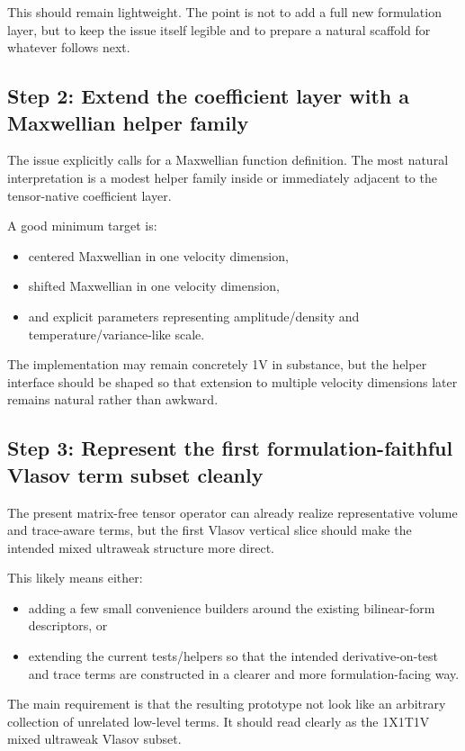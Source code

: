\documentclass[11pt]{article}
\begin{document}
This should remain lightweight. The point is not to add a full new formulation layer, but to keep the issue itself legible and to prepare a natural scaffold for whatever follows next.

\subsection{Step 2: Extend the coefficient layer with a Maxwellian helper family}

The issue explicitly calls for a Maxwellian function definition. The most natural interpretation is a modest helper family inside or immediately adjacent to the tensor-native coefficient layer.

A good minimum target is:
\begin{itemize}[leftmargin=2em]
\item centered Maxwellian in one velocity dimension,
\item shifted Maxwellian in one velocity dimension,
\item and explicit parameters representing amplitude/density and temperature/variance-like scale.
\end{itemize}

The implementation may remain concretely 1V in substance, but the helper interface should be shaped so that extension to multiple velocity dimensions later remains natural rather than awkward.

\subsection{Step 3: Represent the first formulation-faithful Vlasov term subset cleanly}

The present matrix-free tensor operator can already realize representative volume and trace-aware terms, but the first Vlasov vertical slice should make the intended mixed ultraweak structure more direct.

This likely means either:
\begin{itemize}[leftmargin=2em]
\item adding a few small convenience builders around the existing bilinear-form descriptors, or
\item extending the current tests/helpers so that the intended derivative-on-test and trace terms are constructed in a clearer and more formulation-facing way.
\end{itemize}

The main requirement is that the resulting prototype not look like an arbitrary collection of unrelated low-level terms. It should read clearly as the 1X1T1V mixed ultraweak Vlasov subset.
\end{document}
